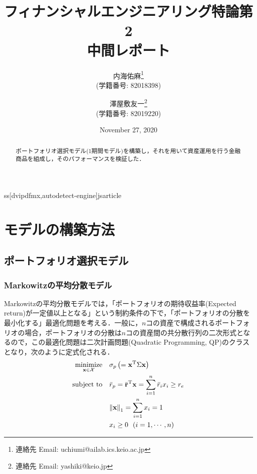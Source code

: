 ss[dvipdfmx,autodetect-engine]{jsarticle}
\usepackage{tikz}
\usepackage{url}
\usepackage{hyperref}
\usepackage{amsmath,amssymb}
\usepackage{comment}


\title{フィナンシャルエンジニアリング特論第2\\中間レポート}
\author{内海佑麻\footnote{連絡先 Email: uchiumi@ailab.ics.keio.ac.jp} \\
    (学籍番号: 82018398)
        \and 澤屋敷友一\footnote{連絡先 Email: yashiki@keio.jp} \\ 
            (学籍番号: 82019220)}
            \date{November 27, 2020}

            

            \maketitle

            \begin{abstract}
            ポートフォリオ選択モデル(1期間モデル)を構築し，それを用いて資産運用を行う金融商品を組成し，そのパフォーマンスを検証した．
            \end{abstract}

            \tableofcontents

            \newpage

            \section{モデルの構築方法}

            \subsection{ポートフォリオ選択モデル}

            \subsubsection{Markowitzの平均分散モデル}

            Markowitzの平均分散モデルでは，「ポートフォリオの期待収益率(Expected return)が一定値以上となる」という制約条件の下で，「ポートフォリオの分散を最小化する」最適化問題を考える．一般に，$n$コの資産で構成されるポートフォリオの場合，ポートフォリオの分散は$n$コの資産間の共分散行列の二次形式となるので，この最適化問題は二次計画問題(Quadratic Programming, QP)のクラスとなり，次のように定式化される．
            \begin{align}
                \underset{\bf x \in \mathcal{X}}{\rm minimize} ~~~ 
                    &\sigma_p \left( = {\bf x}^{\mathrm{T}} \Sigma {\bf x} \right) \\
                        {\rm subject~to} ~~~ &\bar{r}_p = \bar{\bf r}^{\mathrm{T}} {\bf x} = \sum_{i=1}^{n} \bar{r}_i x_i \geq r_e \\
                            &{\| {\bf x} \|}_{1} = \sum_{i=1}^{n} x_i = 1 \\
                                &x_i \geq 0 ~~ (i = 1, \cdots, n)
                                \end{align}


